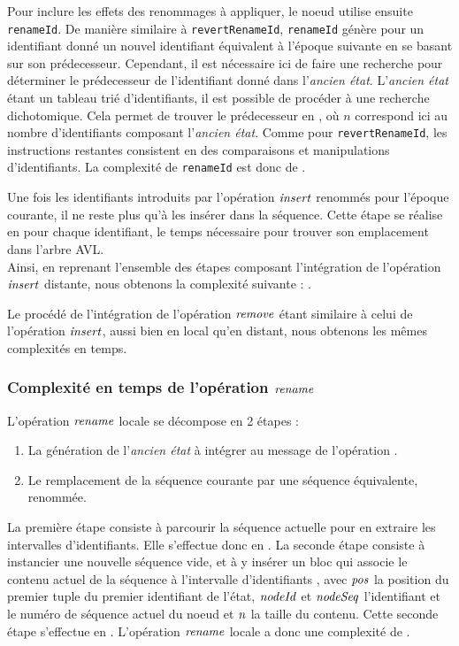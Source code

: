 Pour inclure les effets des renommages à appliquer, le noeud utilise ensuite \texttt{renameId}.
De manière similaire à \texttt{revertRenameId}, \texttt{renameId} génère pour un identifiant donné un nouvel identifiant équivalent à l'époque suivante en se basant sur son prédecesseur.
Cependant, il est nécessaire ici de faire une recherche pour déterminer le prédecesseur de l'identifiant donné dans l'\emph{ancien état}.
L'\emph{ancien état} étant un tableau trié d'identifiants, il est possible de procéder à une recherche dichotomique.
Cela permet de trouver le prédecesseur en , où $n$ correspond ici au nombre d'identifiants composant l'\emph{ancien état}.
Comme pour \texttt{revertRenameId}, les instructions restantes consistent en des comparaisons et manipulations d'identifiants.
La complexité de \texttt{renameId} est donc de .

Une fois les identifiants introduits par l'opération $\mathit{insert}$ renommés pour l'époque courante, il ne reste plus qu'à les insérer dans la séquence.
Cette étape se réalise en  pour chaque identifiant, le temps nécessaire pour trouver son emplacement dans l'arbre AVL.\\

Ainsi, en reprenant l'ensemble des étapes composant l'intégration de l'opération $\mathit{insert}$ distante, nous obtenons la complexité suivante : .

Le procédé de l'intégration de l'opération $\mathit{remove}$ étant similaire à celui de l'opération $\mathit{insert}$, aussi bien en local qu'en distant, nous obtenons les mêmes complexités en temps.

\subsubsection{Complexité en temps de l'opération $\mathit{rename}$}
\label{sec:validation-time-complexity-rename}

L'opération $\mathit{rename}$ locale se décompose en 2 étapes :
\begin{enumerate}
  \item La génération de l'\emph{ancien état} à intégrer au message de l'opération .
  \item Le remplacement de la séquence courante par une séquence équivalente, renommée.
\end{enumerate}
La première étape consiste à parcourir la séquence actuelle pour en extraire les intervalles d'identifiants.
Elle s'effectue donc en .
La seconde étape consiste à instancier une nouvelle séquence vide, et à y insérer un bloc qui associe le contenu actuel de la séquence à l'intervalle d'identifiants , avec $\mathit{pos}$ la position du premier tuple du premier identifiant de l'état, $\mathit{nodeId}$ et $\mathit{nodeSeq}$ l'identifiant et le numéro de séquence actuel du noeud et $\mathit{n}$ la taille du contenu.
Cette seconde étape s'effectue en .
L'opération $\mathit{rename}$ locale a donc une complexité de .\\

